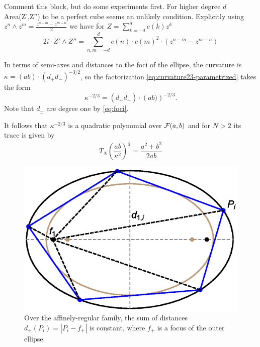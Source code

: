 {\color{orange} Comment this block, but do some experiments first.
For higher degree $d$ Area(Z',Z'') to be a perfect cube seems an unlikely condition.
Explicitly using $z^n \wedge z^m = \frac{z^{n-m} - z^{m-n}}2$
we have for $Z = \sum_{k=-d}^d c(k) z^k$
\begin{equation}
2i \cdot Z' \wedge Z'' = \sum_{n,m=-d}^d c(n)\cdot c(m)^2\cdot \left( z^{n-m}-z^{m-n} \right)
\end{equation}
}

In terms of semi-axes and distances to the foci of the ellipse, the curvature is 
$κ = (a b)\cdot (d_+ d_-)^{-3/2}$,
so the factorization \eqref{eq:curvature23-parametrized} takes the form
\begin{equation}
κ^{-2/3} = \left(d_+ d_-\right) \cdot \left(a b)\right)^{-2/3}.
\end{equation}
Note that $d_\pm$ are degree one by \eqref{eq:foci}.

It follows that $κ^{-2/3}$ is a quadratic polynomial over $\mathcal{F}(a,b)$ and for $N>2$ its trace is given by
\begin{equation}
\label{:kappa}
T_N \left(\frac{ab}{κ^2}\right)^\frac{1}{3} = \frac{a^2 + b^2}{2ab}
\end{equation}

\begin{figure}
    \centering
    \includegraphics[width=.6\textwidth]{pics/0060_spoke_sum.eps}
    \caption{Over the affinely-regular family, the sum of distances $d_+(P_i)=|P_i-f_+|$ is constant, where $f_+$ is a focus of the outer ellipse.}
    \label{fig:spoke-sum}
\end{figure}

